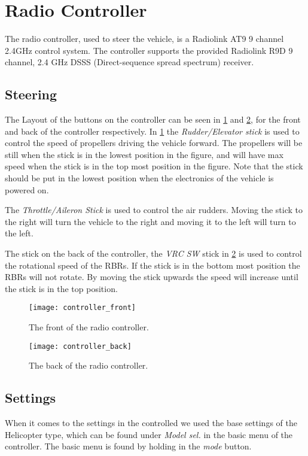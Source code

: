 \section{Radio Controller}
The radio controller, used to steer the vehicle, is a Radiolink AT9 9 channel
2.4GHz control system. The controller supports the provided Radiolink R9D
9 channel, 2.4 GHz DSSS (Direct-sequence spread spectrum) receiver.

\subsection{Steering}
The Layout of the buttons on the controller can be seen in
\cref{fig:controller_front} and \cref{fig:controller_back}, for the front and
back of the controller respectively. In \cref{fig:controller_front} the
\textit{Rudder/Elevator stick} is used to control the speed of propellers
driving the vehicle forward. The propellers will be still when the stick is in the
lowest position in the figure, and will have max speed when the stick is in the
top most position in the figure. Note that the stick should be put in the
lowest position when the electronics of the vehicle is powered on.

The \textit{Throttle/Aileron Stick} is used to control the air rudders. Moving
the stick to the right will turn the vehicle to the right and moving it to the
left will turn to the left.

The stick on the back of the controller, the \textit{VRC SW} stick in
\cref{fig:controller_back} is used to control the rotational speed of the RBRs.
If the stick is in the bottom most position the RBRs will not rotate. By moving
the stick upwards the speed will increase until the stick is in the top
position.

\begin{figure}[h]
   \centering
   \texttt{[image: controller\_front]}
   \caption{The front of the radio controller.}
   \label{fig:controller_front}
\end{figure}

\begin{figure}[h]
   \centering
   \texttt{[image: controller\_back]}
   \caption{The back of the radio controller.}
   \label{fig:controller_back}
\end{figure}

\subsection{Settings}
When it comes to the settings in the controlled we used the base settings of
the Helicopter type, which can be found under \textit{Model sel.} in the basic
menu of the controller. The basic menu is found by holding in the \textit{mode}
button.

